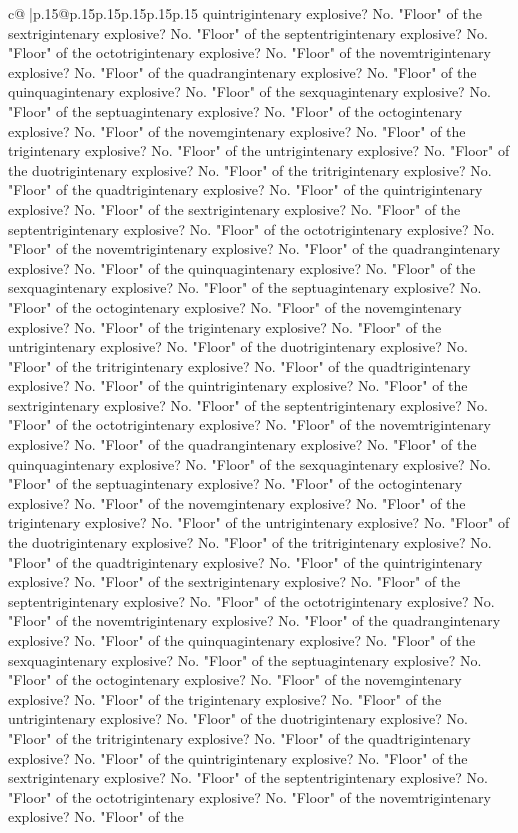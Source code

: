 \documentclass{article}
\begin{document}
{\begin{supertabular}{c@{$\;$}|p{.15\linewidth}@{}p{.15\linewidth}p{.15\linewidth}p{.15\linewidth}p{.15\linewidth}p{.15\linewidth}}
{{{quintrigintenary explosive? No. "Floor" of the sextrigintenary explosive? No. "Floor" of the septentrigintenary explosive? No. "Floor" of the octotrigintenary explosive? No. "Floor" of the novemtrigintenary explosive? No. "Floor" of the quadrangintenary explosive? No. "Floor" of the quinquagintenary explosive? No. "Floor" of the sexquagintenary explosive? No. "Floor" of the septuagintenary explosive? No. "Floor" of the octogintenary explosive? No. "Floor" of the novemgintenary explosive? No. "Floor" of the trigintenary explosive? No. "Floor" of the untrigintenary explosive? No. "Floor" of the duotrigintenary explosive? No. "Floor" of the tritrigintenary explosive? No. "Floor" of the quadtrigintenary explosive? No. "Floor" of the quintrigintenary explosive? No. "Floor" of the sextrigintenary explosive? No. "Floor" of the septentrigintenary explosive? No. "Floor" of the octotrigintenary explosive? No. "Floor" of the novemtrigintenary explosive? No. "Floor" of the quadrangintenary explosive? No. "Floor" of the quinquagintenary explosive? No. "Floor" of the sexquagintenary explosive? No. "Floor" of the septuagintenary explosive? No. "Floor" of the octogintenary explosive? No. "Floor" of the novemgintenary explosive? No. "Floor" of the trigintenary explosive? No. "Floor" of the untrigintenary explosive? No. "Floor" of the duotrigintenary explosive? No. "Floor" of the tritrigintenary explosive? No. "Floor" of the quadtrigintenary explosive? No. "Floor" of the quintrigintenary explosive? No. "Floor" of the sextrigintenary explosive? No. "Floor" of the septentrigintenary explosive? No. "Floor" of the octotrigintenary explosive? No. "Floor" of the novemtrigintenary explosive? No. "Floor" of the quadrangintenary explosive? No. "Floor" of the quinquagintenary explosive? No. "Floor" of the sexquagintenary explosive? No. "Floor" of the septuagintenary explosive? No. "Floor" of the octogintenary explosive? No. "Floor" of the novemgintenary explosive? No. "Floor" of the trigintenary explosive? No. "Floor" of the untrigintenary explosive? No. "Floor" of the duotrigintenary explosive? No. "Floor" of the tritrigintenary explosive? No. "Floor" of the quadtrigintenary explosive? No. "Floor" of the quintrigintenary explosive? No. "Floor" of the sextrigintenary explosive? No. "Floor" of the septentrigintenary explosive? No. "Floor" of the octotrigintenary explosive? No. "Floor" of the novemtrigintenary explosive? No. "Floor" of the quadrangintenary explosive? No. "Floor" of the quinquagintenary explosive? No. "Floor" of the sexquagintenary explosive? No. "Floor" of the septuagintenary explosive? No. "Floor" of the octogintenary explosive? No. "Floor" of the novemgintenary explosive? No. "Floor" of the trigintenary explosive? No. "Floor" of the untrigintenary explosive? No. "Floor" of the duotrigintenary explosive? No. "Floor" of the tritrigintenary explosive? No. "Floor" of the quadtrigintenary explosive? No. "Floor" of the quintrigintenary explosive? No. "Floor" of the sextrigintenary explosive? No. "Floor" of the septentrigintenary explosive? No. "Floor" of the octotrigintenary explosive? No. "Floor" of the novemtrigintenary explosive? No. "Floor" of the }}}
\end{supertabular}}
\end{document}
